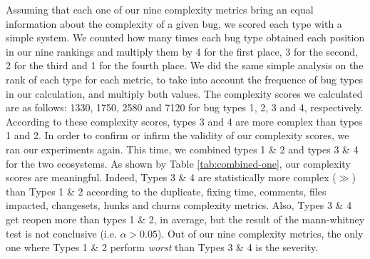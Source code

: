 Assuming that each one of our nine complexity metrics bring an equal information about the complexity of a given bug, we scored each type with a simple system.
We counted how many times each bug type obtained each position in our nine rankings and multiply them by 4 for the first place, 3 for the second, 2 for the third and 1 for the fourth place.
We did the same simple analysis on the rank of each type for each metric, to take into account the frequence of bug types in our calculation, and multiply both values.
The complexity scores we calculated are as follows: 1330, 1750, 2580 and 7120 for bug types 1, 2, 3 and 4, respectively.
According to these complexity scores, types 3 and 4 are more complex than types 1 and 2.
In order to confirm or infirm the validity of our complexity scores, we ran our experiments again.
This time, we combined types 1 \& 2 and types 3 \& 4 for the two ecosystems.
As shown by Table \ref{tab:combined-one}, our complexity scores are meaningful.
Indeed, Types 3 \& 4 are statistically more complex ($\gg$) than Types 1 \& 2 according to the duplicate, fixing time, comments, files impacted, changesets, hunks and churns complexity metrics.
Also, Types 3 \& 4 get reopen more than  types 1 \& 2, in average, but the result of the mann-whitney test is not conclusive (i.e. $\alpha>0.05$).
Out of our nine complexity metrics, the only one where Types 1 \& 2 perform {\it worst} than Types 3 \& 4 is the severity.



% 
